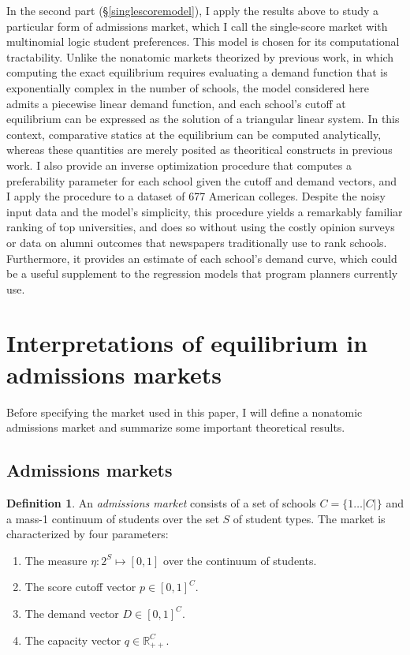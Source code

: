 \documentclass[12pt]{article}
\theoremstyle{definition}
\newtheorem{definition}{Definition}
\begin{document}
In the second part (\S\ref{singlescoremodel}), I apply the results above to study a particular form of admissions market, which I call the single-score market with multinomial logic student preferences. This model is chosen for its computational tractability. Unlike the nonatomic markets theorized by previous work, in which computing the exact equilibrium requires evaluating a demand function that is exponentially complex in the number of schools, the model considered here admits a piecewise linear demand function, and each school's cutoff at equilibrium can be expressed as the solution of a triangular linear system. In this context, comparative statics at the equilibrium can be computed analytically, whereas these quantities are merely posited as theoritical constructs in previous work. I also provide an inverse optimization procedure that computes a preferability parameter for each school given the cutoff and demand vectors, and I apply the procedure to a dataset of 677 American colleges. Despite the noisy input data and the model's simplicity, this procedure yields a remarkably familiar ranking of top universities, and does so without using the costly opinion surveys or data on alumni outcomes that newspapers traditionally use to rank schools. Furthermore, it provides an estimate of each school's demand curve, which could be a useful supplement to the regression models that program planners currently use. 

\section{Interpretations of equilibrium in admissions markets} \label{interpeqinadmmkts}
Before specifying the market used in this paper, I will define a nonatomic admissions market and summarize some important theoretical results.

\subsection{Admissions markets}
\begin{definition} An \emph{admissions market} consists of a set of schools $C = \{ 1\dots |C| \}$ and a mass-1 continuum of students over the set $S$ of student types. The market is characterized by four parameters:
\begin{enumerate}
\item The measure $\eta: 2^S \mapsto [0, 1]$ over the continuum of students.
\item The score cutoff vector $p \in [0, 1]^C$. 
\item The demand vector $D \in [0, 1]^C$.
\item The capacity vector $q \in \mathbb{R}_{++}^C$.
\end{enumerate}
\end{definition}
\end{document}
